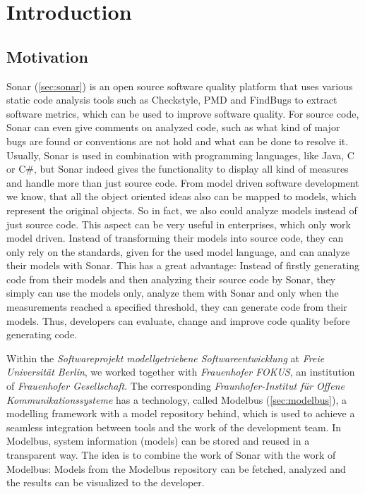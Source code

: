 \chapter{Introduction}

\section{Motivation}
Sonar (\autoref{sec:sonar}) is an open source software quality platform that uses various static code analysis tools such as Checkstyle, PMD and FindBugs to extract software metrics, which can be used to improve software quality. For source code, Sonar can even give comments on analyzed code, such as what kind of major bugs are found or conventions are not hold and what can be done to resolve it. Usually, Sonar is used in combination with programming languages, like Java, C or C\#, but Sonar indeed gives the functionality to display all kind of measures and handle more than just source code. From model driven software development we know, that all the object oriented ideas also can be mapped to models, which represent the original objects. So in fact, we also could analyze models instead of just source code. This aspect can be very useful in enterprises, which only work model driven. Instead of transforming their models into source code, they can only rely on the standards, given for the used model language, and can analyze their models with Sonar. This has a great advantage: Instead of firstly generating code from their models and then analyzing their source code by Sonar, they simply can use the models only, analyze them with Sonar and only when the measurements reached a specified threshold, they can generate code from their models. Thus, developers can evaluate, change and improve code quality before generating code. 

Within the \textit{Softwareprojekt modellgetriebene Softwareentwicklung} at \textit{Freie Universit\"at Berlin}, we worked together with \textit{Frauenhofer FOKUS}, an institution of \textit{Frauenhofer Gesellschaft}. The corresponding \textit{Fraunhofer-Institut für Offene Kommunikationssysteme} has a technology, called Modelbus (\autoref{sec:modelbus}), a modelling framework with a model repository behind, which is used to achieve a seamless integration between tools and the work of the development team. In Modelbus, system information (models) can be stored and reused in a transparent way. The idea is to combine the work of Sonar with the work of Modelbus: Models from the Modelbus repository can be fetched, analyzed and the results can be visualized to the developer.

